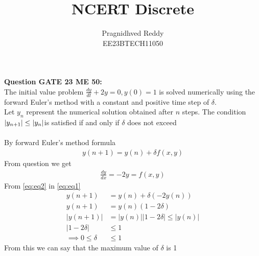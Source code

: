 \documentclass[journal,12pt,twocolumn]{IEEEtran}
\title{NCERT Discrete}
\author{Pragnidhved Reddy\\EE23BTECH11050}
\date{}
\begin{document}
\maketitle
\newpage
\bigskip
\textbf{Question GATE 23 ME 50:}\\
The initial value problem
$\frac{dy}{dt}+2y=0, y(0)=1 $
is solved numerically using the forward Euler's method with a constant and positive time step of $\delta $.\\
Let $y_n$ represent the numerical solution obtained after $n$ steps. The condition $\left\vert y_{n+1}\right\vert \leq \left\vert y_n\right\vert$is satisfied if and only if $\delta$ does not exceed\\
\solution \\
By forward Euler's method formula 
\begin{align}
\label{eq:eq1}
    y(n+1)=y(n)+\delta  f(x,y)
\end{align}
From question we get
\begin{align}
\label{eq:eq2}
    \frac{dy}{dx}=-2y=f(x,y)
\end{align}
From \eqref{eq:eq2} in \eqref{eq:eq1}
\begin{align}
    y(n+1)&=y(n)+\delta(-2y(n))\\
    y(n+1)&=y(n)(1-2\delta )\\
    |y(n+1)|&=|y(n)||1-2\delta | \leq|y(n)|  \\
    |1-2\delta | &\leq 1\\
    \implies 0 \leq \delta  &\leq 1
\end{align}
From this we can say that the maximum value of $\delta  $ is 1
\end{document}

